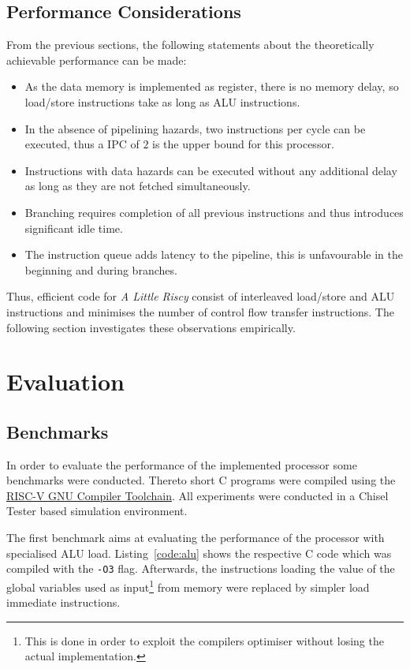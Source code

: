 \documentclass[conference]{IEEEtran}
\begin{document}
\subsection{Performance Considerations} \label{sec:performance}
From the previous sections, the following statements about the theoretically achievable performance can be made:
\begin{itemize}
	\item As the data memory is implemented as register, there is no memory delay, so load/store instructions take as long as ALU instructions.
	\item In the absence of pipelining hazards, two instructions per cycle can be executed, thus a IPC of $2$ is the upper bound for this processor.
	\item Instructions with data hazards can be executed without any additional delay as long as they are not fetched simultaneously.
	\item Branching requires completion of all previous instructions and thus introduces significant idle time.
	\item The instruction queue adds latency to the pipeline, this is unfavourable in the beginning and during branches.
\end{itemize}

Thus, efficient code for \emph{A Little Riscy} consist of interleaved load/store and ALU instructions and minimises the number of control flow transfer instructions. The following section investigates these observations empirically.

\section{Evaluation} \label{sec:eval}

\subsection{Benchmarks}

In order to evaluate the performance of the implemented processor some benchmarks were conducted. Thereto short C programs were compiled using the \href{https://github.com/riscv/riscv-gnu-toolchain}{RISC-V GNU Compiler Toolchain}. All experiments were conducted in a Chisel Tester based simulation environment.
 
The first benchmark aims at evaluating the performance of the processor with specialised ALU load. Listing~\ref{code:alu} shows the respective C code which was compiled with the \verb|-O3| flag. Afterwards, the instructions loading the value of the global variables used as input\footnote{This is done in order to exploit the compilers optimiser without losing the actual implementation.} from memory were replaced by simpler load immediate instructions.
\end{document}
